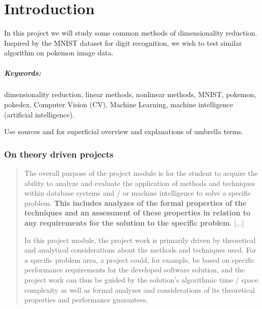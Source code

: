 \chapter{Introduction}\label{cha:introduction}
\noindent
In this project we will study some common methods of dimensionality reduction. Inspired by the MNIST dataset for digit recognition, we wish to test similar algorithm on pokemon image data.

\paragraph{Keywords:} dimensionality reduction, linear methods, nonlinear methods, MNIST, pokemon, pokedex, Computer Vision (CV), Machine Learning, machine intelligence (artificial intelligence).

Use sources \cite{IBM-machine-intelligence} and \cite{IBM-computer-vision} for superficial overview and explanations of umbrella terms.


\subsection*{On theory driven projects}
\blockcquote{Projectmodule}{The overall purpose of the project module is for the student to acquire the ability to analyze and evaluate the application of methods and techniques within database systems and / or machine intelligence to solve a specific problem. \textbf{This includes analyzes of the formal properties of the techniques and an assessment of these properties in relation to any requirements for the solution to the specific problem}. [...]

In this project module, the project work is primarily driven by theoretical and analytical considerations about the methods and techniques used. For a specific problem area, a project could, for example, be based on specific performance requirements for the developed software solution, and the project work can thus be guided by the solution's algorithmic time / space complexity as well as formal analyzes and considerations of its theoretical properties and performance guarantees.}



